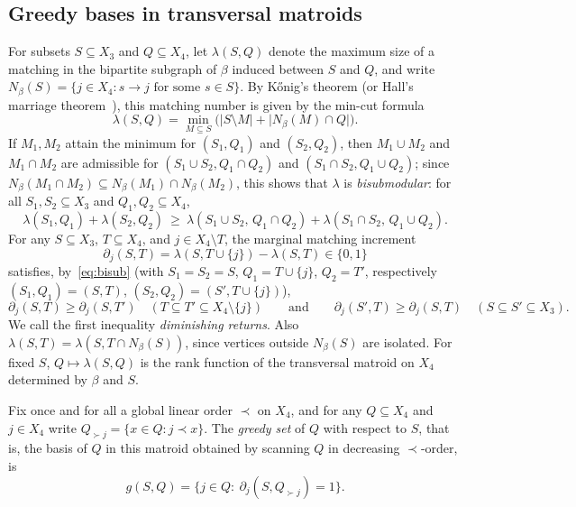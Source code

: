 \documentclass[11pt]{amsart}
\theoremstyle{remark}
\newcommand{\abs}[1]{\lvert #1\rvert}
\begin{document}
\subsection{Greedy bases in transversal matroids}\label{sec:greedy}

For subsets $S\subseteq X_3$ and $Q\subseteq X_4$, let $\lambda(S,Q)$ denote the maximum size of a matching in the bipartite subgraph of $\beta$ induced between $S$ and $Q$, and write $N_\beta(S)=\{j\in X_4:s\to j\text{ for some }s\in S\}$. By K\H{o}nig's theorem (or Hall's marriage theorem~\cite{Hall}), this matching number is given by the min-cut formula
\[
  \lambda(S,Q)=\min_{M\subseteq S}\bigl(\abs{S\setminus M}+\abs{N_\beta(M)\cap Q}\bigr).
\]
If $M_1,M_2$ attain the minimum for $(S_1,Q_1)$ and $(S_2,Q_2)$, then $M_1\cup M_2$ and $M_1\cap M_2$ are admissible for $(S_1\cup S_2,Q_1\cap Q_2)$ and $(S_1\cap S_2,Q_1\cup Q_2)$; since $N_\beta(M_1\cap M_2)\subseteq N_\beta(M_1)\cap N_\beta(M_2)$, this shows that $\lambda$ is \emph{bisubmodular}: for all $S_1,S_2\subseteq X_3$ and $Q_1,Q_2\subseteq X_4$,
\begin{equation}\label{eq:bisub}
  \lambda(S_1,Q_1)+\lambda(S_2,Q_2)\ \ge\
  \lambda(S_1\cup S_2,\,Q_1\cap Q_2)+\lambda(S_1\cap S_2,\,Q_1\cup Q_2).
\end{equation}
For any $S\subseteq X_3$, $T\subseteq X_4$, and $j\in X_4\setminus T$, the marginal matching increment
\[
  \partial_j(S,T)=\lambda(S,T\cup\{j\})-\lambda(S,T)\in\{0,1\}
\]
satisfies, by~\eqref{eq:bisub} (with $S_1=S_2=S$, $Q_1=T\cup\{j\}$, $Q_2=T'$, respectively $(S_1,Q_1)=(S,T)$, $(S_2,Q_2)=(S',T\cup\{j\})$),
\begin{equation}\label{eq:mono}
  \partial_j(S,T)\ge\partial_j(S,T')\quad(T\subseteq T'\subseteq X_4\setminus\{j\})
  \qquad\text{and}\qquad
  \partial_j(S',T)\ge\partial_j(S,T)\quad(S\subseteq S'\subseteq X_3).
\end{equation}
We call the first inequality \emph{diminishing returns}. Also $\lambda(S,T)=\lambda(S,T\cap N_\beta(S))$, since vertices outside $N_\beta(S)$ are isolated. For fixed $S$, $Q\mapsto\lambda(S,Q)$ is the rank function of the transversal matroid on $X_4$ determined by $\beta$ and $S$.

Fix once and for all a global linear order $\prec$ on $X_4$, and for any $Q\subseteq X_4$ and $j\in X_4$ write $Q_{\succ j}=\{x\in Q:j\prec x\}$. The \emph{greedy set} of $Q$ with respect to $S$, that is, the basis of $Q$ in this matroid obtained by scanning $Q$ in decreasing $\prec$-order, is
\[
  g(S,Q)=\{j\in Q:\ \partial_j(S,Q_{\succ j})=1\}.
\]
\end{document}
